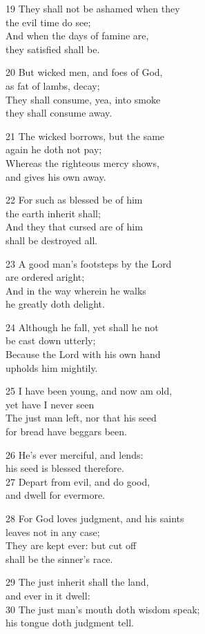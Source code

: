 19 They shall not be ashamed when they\\
the evil time do see;\\
And when the days of famine are,\\
they satisfied shall be.

20 But wicked men, and foes of God,\\
as fat of lambs, decay;\\
They shall consume, yea, into smoke\\
they shall consume away.

21 The wicked borrows, but the same\\
again he doth not pay;\\
Whereas the righteous mercy shows,\\
and gives his own away.

22 For such as blessed be of him\\
the earth inherit shall;\\
And they that cursed are of him\\
shall be destroyed all.

23 A good man’s footsteps by the Lord\\
are ordered aright;\\
And in the way wherein he walks\\
he greatly doth delight.

24 Although he fall, yet shall he not\\
be cast down utterly;\\
Because the Lord with his own hand\\
upholds him mightily.

25 I have been young, and now am old,\\
yet have I never seen\\
The just man left, nor that his seed\\
for bread have beggars been.

26 He’s ever merciful, and lends:\\
his seed is blessed therefore.\\
27 Depart from evil, and do good,\\
and dwell for evermore.

28 For God loves judgment, and his saints\\
leaves not in any case;\\
They are kept ever: but cut off\\
shall be the sinner’s race.

29 The just inherit shall the land,\\
and ever in it dwell:\\
30 The just man’s mouth doth wisdom speak;\\
his tongue doth judgment tell.

